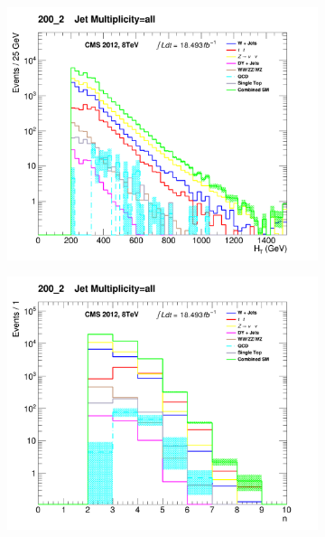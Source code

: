 \begin{figure}[h!]
  \centering
  \begin{subfigure}[b]{0.46\textwidth}
    \includegraphics[width=\textwidth]{Figs/datamc/had/qcd/HT_all_200_upwards.png}
    \caption{\HT}
    \label{fig:had_qcd_mc_HT}
  \end{subfigure}
  \begin{subfigure}[b]{0.46\textwidth}
    \includegraphics[width=\textwidth]
    {Figs/datamc/had/qcd/JetMultiplicity_all_200_upwards.png}
    \caption{\nj}
    \label{fig:had_qcd_mc_njet}
  \end{subfigure}\\

\end{figure}
